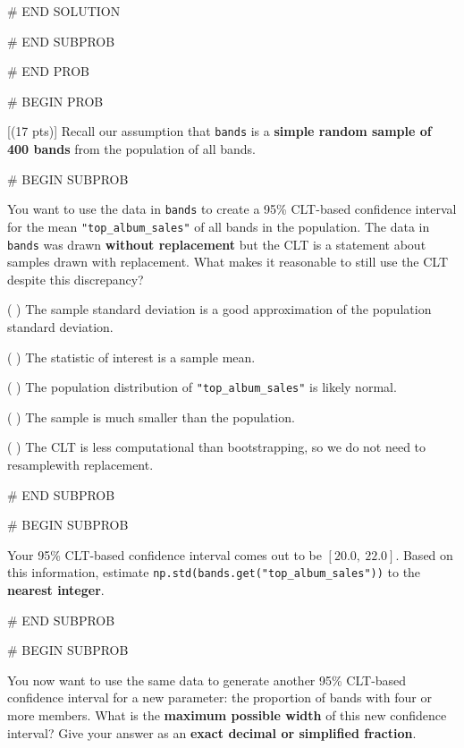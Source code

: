 \documentclass[twoside,12pt]{article}
\begin{document}
{# END SOLUTION



# END SUBPROB



# END PROB

\newpage

# BEGIN PROB

[(17 pts)]
Recall our assumption that \texttt{bands} is a \textbf{simple random sample of 400 bands} from the population of all bands.



# BEGIN SUBPROB

 You want to use the data in \texttt{bands} to create a 95\% CLT-based confidence interval for the mean \texttt{"top\_album\_sales"} of all bands in the population. The data in \texttt{bands} was drawn \textbf{without replacement} but the CLT is a statement about samples drawn with replacement. What makes it reasonable to still use the CLT despite this discrepancy?

\smallskip
( ) The sample standard deviation is a good approximation of the population standard \gap deviation.

\smallskip
( ) The statistic of interest is a sample mean.

\smallskip
( ) The population distribution of \texttt{"top\_album\_sales"} is likely normal.

\smallskip
( ) The sample is much smaller than the population.

\smallskip
( ) The CLT is less computational than bootstrapping, so we do not need to resample\gap with replacement.





# END SUBPROB

\bigskip

# BEGIN SUBPROB

 Your 95\% CLT-based confidence interval comes out to be $[20.0,\ 22.0]$. Based on this information, estimate \texttt{np.std(bands.get("top\_album\_sales"))} to the \textbf{nearest integer}.

\begin{center}
\end{center}



# END SUBPROB

\bigskip

# BEGIN SUBPROB

 You now want to use the same data to generate another 95\% CLT-based confidence interval for a new parameter: the proportion of bands with four or more members. What is the \textbf{maximum possible width} of this new confidence interval? Give your answer as an \textbf{exact decimal or simplified fraction}.

}
\end{document}
